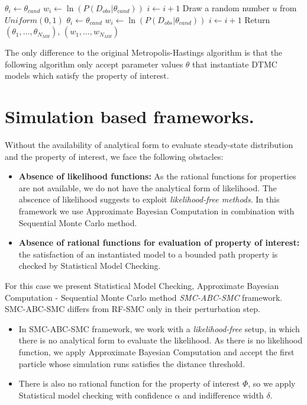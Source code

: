 \begin{algorithm}[H]
\begin{algorithmic}[1]
        \EndWhile
        \State $\theta_i \leftarrow \theta_{cand}$
        \State $w_i \leftarrow \ln(P(D_{obs}|\theta_{cand}))$
        \State $i \leftarrow i + 1$
        \Else
        \State Draw a random number $u$ from $Uniform(0,1)$
        \State $\theta_i \leftarrow \theta_{cand}$
        \State $w_i \leftarrow \ln(P(D_{obs}|\theta_{cand}))$
        \State $i \leftarrow i + 1$
        \EndIf
        \EndIf
        \EndWhile
        \State Return $(\theta_1,\ldots,\theta_{N_{MH}})$, $(w_1,\ldots,w_{N_{MH}})$
        \EndProcedure
    \end{algorithmic}
\end{algorithm}
The only difference to the original Metropolis-Hastings algorithm is that the following algorithm
only accept parameter values $\theta$ that instantiate DTMC models which satisfy the property of
interest.

\section{Simulation based frameworks.}
Without the availability of analytical form to evaluate steady-state distribution and the property of
interest, we face the following obstacles:
\begin{itemize}
    \item \textbf{Absence of likelihood functions:} As the rational functions for properties are not
          available, we do not have the analytical form of likelihood. The abscence of likelihood
          suggests to exploit \textit{likelihood-free methods}. In this framework we use Approximate
          Bayesian Computation in combination with Sequential Monte Carlo method.
    \item \textbf{Absence of rational functions for evaluation of property of interest:} the
          satisfaction of an instantiated model to a bounded path property is checked by Statistical
          Model Checking.
\end{itemize}
For this case we present Statistical Model Checking, Approximate Bayesian Computation - Sequential
Monte Carlo method \textit{SMC-ABC-SMC} framework. SMC-ABC-SMC differs from RF-SMC only in their
perturbation step.
\begin{itemize}
    \item In SMC-ABC-SMC framework, we work with a \textit{likelihood-free} setup, in which there is
          no analytical form to evaluate the likelihood. As there is no likelihood function, we
          apply Approximate Bayesian Computation and  accept the first particle whose simulation runs
          satisfies the distance threshold.
    \item There is also no rational function for the property
          of interest $\Phi$, so we apply Statistical model checking with confidence $\alpha$ and indifference
          width $\delta$.
\end{itemize}

